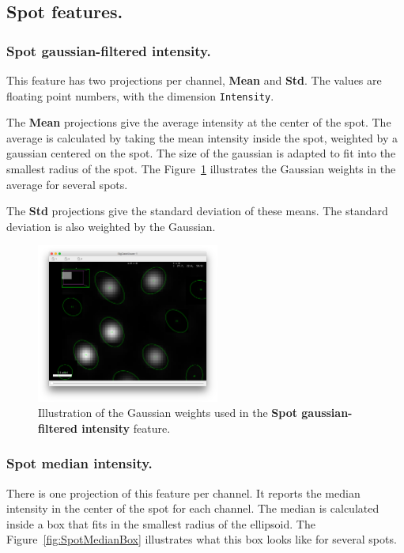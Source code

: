 \subsection{Spot features.}

\subsubsection{Spot gaussian-filtered intensity.}

This feature has two projections per channel, \textbf{Mean} and \textbf{Std}.
The values are floating point numbers, with the dimension \texttt{Intensity}.

The \textbf{Mean} projections give the average intensity at the center of the spot.
The average is calculated by taking the mean intensity inside the spot, weighted by a gaussian centered on the spot.
The size of the gaussian is adapted to fit into the smallest radius of the spot.
The Figure~\ref{fig:SpotGaussWeights} illustrates the Gaussian weights in the average for several spots.

The \textbf{Std} projections give the standard deviation of these means. 
The standard deviation is also weighted by the Gaussian.

\begin{figure}
    \centering
    \includegraphics[width=6cm]{figures/Mastodon_GaussMeanIntensityWeights.png}
    \caption{Illustration of the Gaussian weights used in the \textbf{Spot gaussian-filtered intensity} feature.}
    \label{fig:SpotGaussWeights}
\end{figure}
    
\subsubsection{Spot median intensity.}

There is one projection of this feature per channel.
It reports the median intensity in the center of the spot for each channel.
The median is calculated inside a box that fits in the smallest radius of the ellipsoid.
The Figure~\ref{fig:SpotMedianBox} illustrates what this box looks like for several spots.

